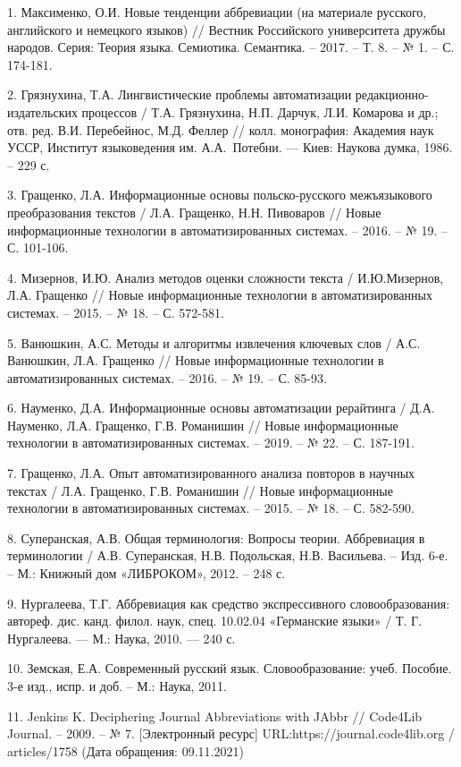 \documentclass[14pt]{extarticle}
\begin{document}
1. Максименко, О.И. Новые тенденции аббревиации (на материале русского, английского и немецкого языков) // Вестник Российского университета дружбы народов. Серия: Теория языка. Семиотика. Семантика. – 2017. – Т. 8. – № 1. – С. 174-181.

2. Грязнухина, Т.А. Лингвистические проблемы автоматизации редакционно-издательских процессов / Т.А. Грязнухина, Н.П. Дарчук, Л.И. Комарова и др.; отв. ред. В.И. Перебейнос, М.Д. Феллер // колл. монография: Академия наук УССР, Институт языковедения им. А.А. Потебни. — Киев: Наукова думка, 1986. – 229 с.

3. Гращенко, Л.А. Информационные основы польско-русского межъязыкового преобразования текстов / Л.А. Гращенко, Н.Н. Пивоваров // Новые информационные технологии в автоматизированных системах. – 2016. – № 19. – С. 101-106.

4. Мизернов, И.Ю. Анализ методов оценки сложности текста / И.Ю.Мизернов, Л.А. Гращенко // Новые информационные технологии в автоматизированных системах. – 2015. – № 18. – С. 572-581.

5. Ванюшкин, А.С. Методы и алгоритмы извлечения ключевых слов / А.С. Ванюшкин, Л.А. Гращенко // Новые информационные технологии в автоматизированных системах. – 2016. – № 19. – С. 85-93.

6. Науменко, Д.А. Информационные основы автоматизации рерайтинга / Д.А. Науменко, Л.А. Гращенко, Г.В. Романишин // Новые информационные технологии в автоматизированных системах. – 2019. – № 22. – С. 187-191.

7. Гращенко, Л.А. Опыт автоматизированного анализа повторов в научных текстах / Л.А. Гращенко, Г.В. Романишин // Новые информационные технологии в автоматизированных системах. – 2015. – № 18. – С. 582-590.

8. Суперанская, А.В. Общая терминология: Вопросы теории. Аббревиация в терминологии / А.В. Суперанская, Н.В. Подольская, Н.В. Васильева. – Изд. 6-е. – М.: Книжный дом «ЛИБРОКОМ», 2012. – 248 с.

9. Нургалеева, Т.Г. Аббревиация как средство экспрессивного словообразования: автореф. дис. канд. филол. наук, спец. 10.02.04 «Германские языки» / Т. Г. Нургалеева. — М.: Наука, 2010. — 240 с.

10. Земская, Е.А. Современный русский язык. Словообразование: учеб. Пособие. 3-е изд., испр. и доб. – М.: Наука, 2011.

\newpage
    
11. Jenkins K. Deciphering Journal Abbreviations with JAbbr // Code4Lib Journal. – 2009. – № 7. [Электронный ресурс] URL:https://journal.code4lib.org / articles/1758 (Дата обращения: 09.11.2021)
\end{document}
